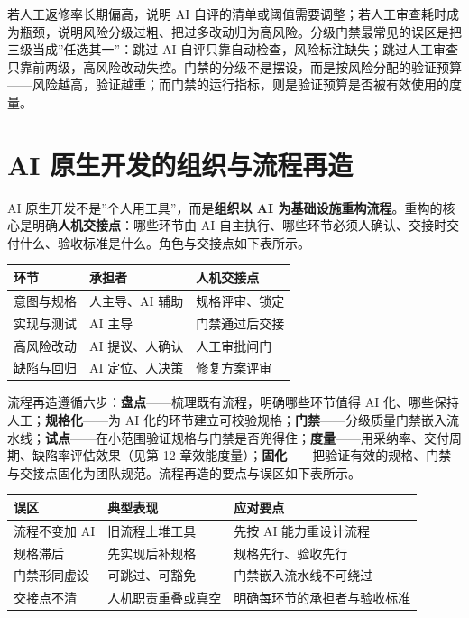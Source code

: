 \documentclass[
]{ctexbook}
\newcounter{none}
\begin{document}
若人工返修率长期偏高，说明 AI
自评的清单或阈值需要调整；若人工审查耗时成为瓶颈，说明风险分级过粗、把过多改动归为高风险。分级门禁最常见的误区是把三级当成''任选其一''：跳过
AI
自评只靠自动检查，风险标注缺失；跳过人工审查只靠前两级，高风险改动失控。门禁的分级不是摆设，而是按风险分配的验证预算------风险越高，验证越重；而门禁的运行指标，则是验证预算是否被有效使用的度量。

\section{AI
原生开发的组织与流程再造}\label{ai-ux539fux751fux5f00ux53d1ux7684ux7ec4ux7ec7ux4e0eux6d41ux7a0bux518dux9020}

AI 原生开发不是''个人用工具''，而是\textbf{组织以 AI
为基础设施重构流程}。重构的核心是明确\textbf{人机交接点}：哪些环节由 AI
自主执行、哪些环节必须人确认、交接时交付什么、验收标准是什么。角色与交接点如下表所示。

{\def\LTcaptype{none} %
\begin{longtable}[]{@{}lll@{}}
\toprule\noalign{}
环节 & 承担者 & 人机交接点 \\
\midrule\noalign{}
\endhead
\bottomrule\noalign{}
\endlastfoot
意图与规格 & 人主导、AI 辅助 & 规格评审、锁定 \\
实现与测试 & AI 主导 & 门禁通过后交接 \\
高风险改动 & AI 提议、人确认 & 人工审批闸门 \\
缺陷与回归 & AI 定位、人决策 & 修复方案评审 \\
\end{longtable}
}

流程再造遵循六步：\textbf{盘点}------梳理既有流程，明确哪些环节值得 AI
化、哪些保持人工；\textbf{规格化}------为 AI
化的环节建立可校验规格；\textbf{门禁}------分级质量门禁嵌入流水线；\textbf{试点}------在小范围验证规格与门禁是否兜得住；\textbf{度量}------用采纳率、交付周期、缺陷率评估效果（见第
12
章效能度量）；\textbf{固化}------把验证有效的规格、门禁与交接点固化为团队规范。流程再造的要点与误区如下表所示。

{\def\LTcaptype{none} %
\begin{longtable}[]{@{}lll@{}}
\toprule\noalign{}
误区 & 典型表现 & 应对要点 \\
\midrule\noalign{}
\endhead
\bottomrule\noalign{}
\endlastfoot
流程不变加 AI & 旧流程上堆工具 & 先按 AI 能力重设计流程 \\
规格滞后 & 先实现后补规格 & 规格先行、验收先行 \\
门禁形同虚设 & 可跳过、可豁免 & 门禁嵌入流水线不可绕过 \\
交接点不清 & 人机职责重叠或真空 & 明确每环节的承担者与验收标准 \\
\end{longtable}
}
\end{document}
